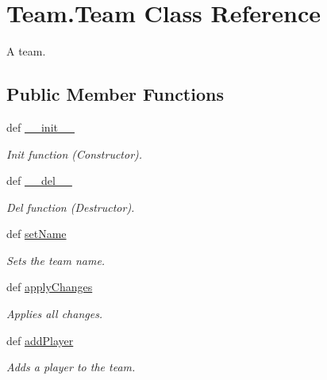 \hypertarget{class_team_1_1_team}{
\section{Team.Team Class Reference}
\label{class_team_1_1_team}
}


A team.  


\subsection*{Public Member Functions}
\begin{DoxyCompactItemize}
\item 
def \hyperlink{class_team_1_1_team_a6ff7995fb1950ca7246a09809982ea46}{\_\-\_\-init\_\-\_\-}
\begin{DoxyCompactList}\small\item\em Init function (Constructor). \item\end{DoxyCompactList}\item 
def \hyperlink{class_team_1_1_team_a177142424d70a4d21948ebe77599f69e}{\_\-\_\-del\_\-\_\-}
\begin{DoxyCompactList}\small\item\em Del function (Destructor). \item\end{DoxyCompactList}\item 
def \hyperlink{class_team_1_1_team_aa0bb9f9288f706bf004eb7d6f27dd8f3}{setName}
\begin{DoxyCompactList}\small\item\em Sets the team name. \item\end{DoxyCompactList}\item 
def \hyperlink{class_team_1_1_team_aaaf23ba740b24f1d5b136ff157dc8cf0}{applyChanges}
\begin{DoxyCompactList}\small\item\em Applies all changes. \item\end{DoxyCompactList}\item 
def \hyperlink{class_team_1_1_team_ae9ec6714408a6ff12f5c68242e16732e}{addPlayer}
\begin{DoxyCompactList}\small\item\em Adds a player to the team. \item\end{DoxyCompactList}\item 

\end{DoxyCompactItemize}
